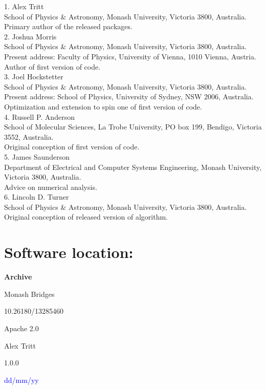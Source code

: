 \documentclass{jors}
\begin{document}
1. Alex Tritt\\
	School of Physics \& Astronomy, Monash University, Victoria 3800, Australia.\\
	Primary author of the released packages.\\
2. Joshua Morris\\
	School of Physics \& Astronomy, Monash University, Victoria 3800, Australia.\\
	Present address: Faculty of Physics, University of Vienna, 1010 Vienna, Austria.\\
	Author of first version of code.\\
3. Joel Hockstetter\\
	School of Physics \& Astronomy, Monash University, Victoria 3800, Australia.\\
	Present address: School of Physics, University of Sydney, NSW 2006, Australia.\\
	Optimization and extension to spin one of first version of code.\\
4. Russell P. Anderson\\
	School of Molecular Sciences, La Trobe University, PO box 199, Bendigo, Victoria 3552, Australia.\\
	Original conception of first version of code.\\
5. James Saunderson\\
	Department of Electrical and Computer Systems Engineering, Monash University, Victoria 3800, Australia.\\
	Advice on numerical analysis.\\
6. Lincoln D. Turner\\
	School of Physics \& Astronomy, Monash University, Victoria 3800, Australia.\\
	Original conception of released version of algorithm.

\section{Software location:}

{\bf Archive}

\begin{description}[noitemsep,topsep=0pt]
	\item[Name:] Monash Bridges
	\item[Persistent identifier:] 10.26180/13285460
	\item[Licence:] Apache 2.0
	\item[Publisher:]  Alex Tritt
	\item[Version published:] 1.0.0
	\item[Date published:] \textcolor{blue}{dd/mm/yy}
\end{description}
\end{document}
